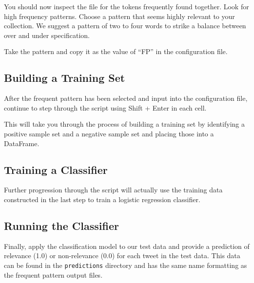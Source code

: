 You should now inspect the file for the tokens frequently found together. Look for high frequency patterns. Choose a pattern that seems highly relevant to your collection. We suggest a pattern of two to four words to strike a balance between over and under specification.

Take the pattern and copy it as the value of ``FP'' in the configuration file.


\subsection{Building a Training Set}

After the frequent pattern has been selected and input into the configuration file, continue to step through the script using Shift + Enter  in each cell.

This will take you through the process of building a training set by identifying a positive sample set and a negative sample set and placing those into a DataFrame.

\subsection{Training a Classifier}

Further progression through the script will actually use the training data constructed in the last step to train a logistic regression classifier.

\subsection{Running the Classifier}

Finally, apply the classification model to our test data and provide a prediction of relevance (1.0) or non-relevance (0.0) for each tweet in the test data. This data can be found in the \texttt{predictions} directory and has the same name formatting as the frequent pattern output files.






